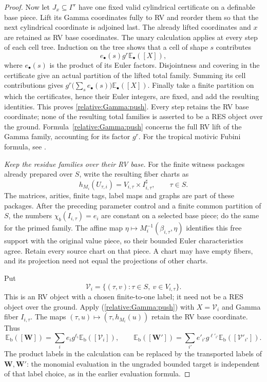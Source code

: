 \begin{proof}
Now let $J_x\subseteq\Gamma^r$ have one fixed valid cylindrical
certificate on a definable base piece. Lift its Gamma coordinates fully
to RV and reorder them so that the next cylindrical coordinate is
adjoined last. The already lifted coordinates and $x$ are retained as
RV base coordinates. The unary calculation applies at every step of
each cell tree. Induction on the tree shows that a cell of shape $s$
contributes
\[
 e_\bullet(s)g^r\mathbb E_\bullet([X]),
\]
where $e_\bullet(s)$ is the product of its Euler factors.
Disjointness and covering in the certificate give an actual partition
of the lifted total family. Summing its cell contributions gives
$g^r\bigl(\sum_s e_\bullet(s)\bigr)\mathbb E_\bullet([X])$.
Finally take a finite partition on which the certificates, hence their
Euler integers, are fixed, and add the resulting identities. This
proves \eqref{relative:Gamma:push}.
Every step retains the RV base coordinate; none of the resulting total
families is asserted to be a RES object over the ground.
Formula~\eqref{relative:Gamma:push} concerns the full RV lift of the
Gamma family, accounting for its factor $g^r$. For the tropical motivic
Fubini formula, see \cite[Theorem 3.1.3]{NicaisePayne}.

\medskip
\noindent\emph{Keep the residue families over their RV base.}
For the finite witness packages already prepared over $S$, write the resulting
fiber charts as
\[
 h_{M_i}(U_{\tau,i})
      =V_{i,\tau}\times I_{i,\tau}^{\sharp},
 \qquad \tau\in S.
\]
The matrices, arities, finite tags, label maps and graphs
are part of these packages.
After the preceding parameter control and a finite common
partition of $S$, the numbers
$\chi_b(I_{i,\tau})=e_i$ are constant on a selected base
piece; do the same for the primed family.
The affine map
$\eta\mapsto M_i^{-1}(\beta_{i,\tau},\eta)$ identifies
this free support with the original value piece, so their
bounded Euler characteristics agree.
Retain every source chart on that piece. A chart may have
empty fibers, and its projection need not equal the
projections of other charts.

Put
\[
 \mathcal V_i=\{(\tau,v):\tau\in S,\ v\in V_{i,\tau}\}.
\]
This is an RV object with a chosen finite-to-one label;
it need not be a RES object over the ground.
Apply (\ref{relative:Gamma:push}) with
$X=\mathcal V_i$ and Gamma fiber $I_{i,\tau}$.
The maps $(\tau,u)\mapsto(\tau,h_{M_i}(u))$
retain the RV base coordinate. Thus
\begin{equation}\label{fubini:family:coefficients}
 \mathbb E_{\mathrm b}([\bm W])
   =\sum_i e_i g^{\ell_i}
               \mathbb E_{\mathrm b}([\mathcal V_i]),
 \qquad
 \mathbb E_{\mathrm b}([\bm W'])
   =\sum_{i'} e'_{i'}g^{\ell'_{i'}}
               \mathbb E_{\mathrm b}([\mathcal V'_{i'}]).
\end{equation}
The product labels in the calculation can be replaced by
the transported labels of $\bm W,\bm W'$: the monomial
evaluation in the ungraded bounded target is independent
of that label choice, as in the earlier evaluation formula.


\end{proof}
